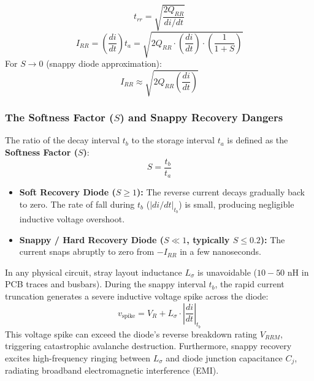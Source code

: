 \documentclass[11pt,a4paper]{article}
\begin{document}
\begin{formulabox}
\begin{equation}
t_{rr} = \sqrt{\frac{2 Q_{RR}}{di/dt}}
\end{equation}
\begin{equation}
I_{RR} = \left(\frac{di}{dt}\right) t_a = \sqrt{2 Q_{RR} \cdot \left(\frac{di}{dt}\right) \cdot \left(\frac{1}{1 + S}\right)}
\end{equation}
For $S \to 0$ (snappy diode approximation):
\begin{equation}
I_{RR} \approx \sqrt{2 Q_{RR} \left(\frac{di}{dt}\right)}
\end{equation}
\end{formulabox}


\subsubsection{The Softness Factor ($S$) and Snappy Recovery Dangers}
The ratio of the decay interval $t_b$ to the storage interval $t_a$ is defined as the \textbf{Softness Factor ($S$)}:
\begin{equation}
S = \frac{t_b}{t_a}
\end{equation}
\begin{itemize}[leftmargin=*]
  \item \textbf{Soft Recovery Diode ($S \ge 1$):} The reverse current decays gradually back to zero. The rate of fall during $t_b$ ($|di/dt|_{t_b}$) is small, producing negligible inductive voltage overshoot.
  \item \textbf{Snappy / Hard Recovery Diode ($S \ll 1$, typically $S \le 0.2$):} The current snaps abruptly to zero from $-I_{RR}$ in a few nanoseconds. 
\end{itemize}

\begin{alertbox}
In any physical circuit, stray layout inductance $L_{\sigma}$ is unavoidable ($10 - 50\text{ nH}$ in PCB traces and busbars). During the snappy interval $t_b$, the rapid current truncation generates a severe inductive voltage spike across the diode:
\begin{equation}
v_{\text{spike}} = V_R + L_{\sigma} \cdot \left|\frac{di}{dt}\right|_{t_b}
\end{equation}
This voltage spike can exceed the diode's reverse breakdown rating $V_{RRM}$, triggering catastrophic avalanche destruction. Furthermore, snappy recovery excites high-frequency ringing between $L_{\sigma}$ and diode junction capacitance $C_j$, radiating broadband electromagnetic interference (EMI).
\end{alertbox}
\end{document}
